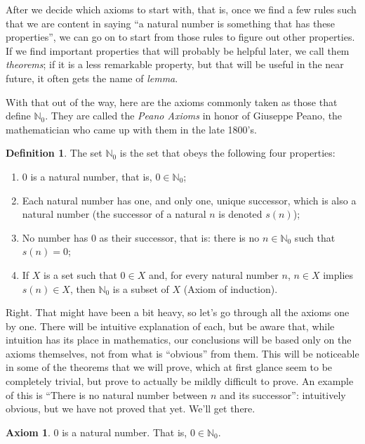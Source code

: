\documentclass[12pt,a4paper]{article}
\theoremstyle{definition}
\newtheorem{definition}{Definition}
\theoremstyle{definition}
\newtheorem{axiom}{Axiom}
\theoremstyle{plain}
\theoremstyle{plain}
\newcommand{\N}{\mathbb{N}}
\begin{document}
	After we decide which axioms to start with, that is, once we find a few rules such that we are content in saying ``a natural number is something that has these properties'', we can go on to start from those rules to figure out other properties. If we find important properties that will probably be helpful later, we call them \emph{theorems}; if it is a less remarkable property, but that will be useful in the near future, it often gets the name of \emph{lemma}.
	
	With that out of the way, here are the axioms commonly taken as those that define $\N_0$. They are called the \emph{Peano Axioms} in honor of Giuseppe Peano, the mathematician who came up with them in the late 1800's.
	
	\begin{definition}
		The set $\N_0$ is the set that obeys the following four properties:
		\begin{enumerate}
			\item $0$ is a natural number, that is, $0 \in \N_0$;
			\item Each natural number has one, and only one, unique successor, which is also a natural number (the successor of a natural $n$ is denoted $s(n)$);
			\item No number has $0$ as their successor, that is: there is no $n \in \N_0$ such that $s(n) = 0$;
			\item If $X$ is a set such that $0 \in X$ and, for every natural number $n$, $n \in X$ implies $s(n) \in X$, then $\N_0$ is a subset of $X$ (Axiom of induction).
		\end{enumerate}
	\end{definition}
	
	Right. That might have been a bit heavy, so let's go through all the axioms one by one. There will be intuitive explanation of each, but be aware that, while intuition has its place in mathematics, our conclusions will be based only on the axioms themselves, not from what is ``obvious'' from them. This will be noticeable in some of the theorems that we will prove, which at first glance seem to be completely trivial, but prove to actually be mildly difficult to prove. An example of this is ``There is no natural number between $n$ and its successor'': intuitively obvious, but we have not proved that yet. We'll get there.
	
	\begin{axiom}
		0 is a natural number. That is, $0 \in \N_0$.
	\end{axiom}
	
\end{document}
